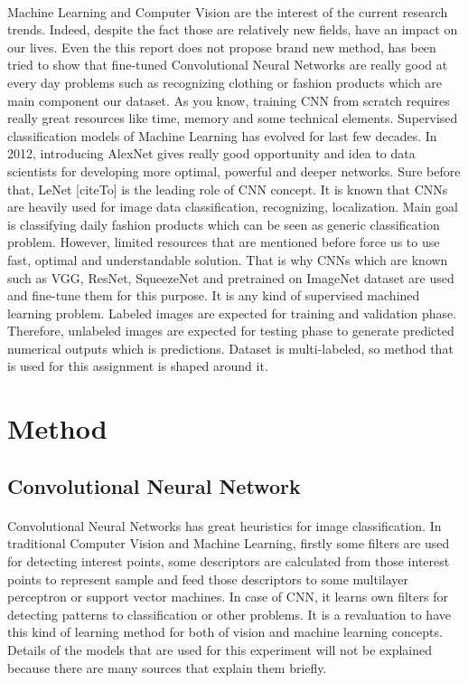 \paragraph{} Machine Learning and Computer Vision are the interest of the current research trends. Indeed, despite the fact those are relatively new fields, have an impact on our lives. Even the this report does not propose brand new method, has been tried to show that fine-tuned Convolutional Neural Networks are really good at every day problems such as recognizing clothing or fashion products which are main component our dataset. As you know, training CNN from scratch  requires really great resources like time, memory and some technical elements. Supervised  classification models of Machine Learning has evolved for last few decades. In 2012, introducing AlexNet \cite{alexnet}  gives really good opportunity and idea to data scientists for developing more optimal, powerful and deeper networks. Sure before that, LeNet [citeTo] is the leading role of CNN concept. It is known that CNNs are heavily used for image data classification, recognizing, localization. Main goal is classifying daily fashion products which can be seen as generic classification problem. However, limited resources that are mentioned before force us to use fast, optimal and understandable solution. That is why CNNs which are known such as VGG\cite{vggNet}, ResNet\cite{resnet}, SqueezeNet\cite{squeezenet} and pretrained on ImageNet dataset\cite{imageNet} are used and fine-tune them for this purpose. It is any kind of supervised machined learning problem. Labeled images are expected for training and validation phase. Therefore, unlabeled images are expected for testing phase to generate predicted numerical outputs which is predictions. Dataset is multi-labeled, so method that is used for this assignment is shaped around it.            

\section{Method}

\subsection{Convolutional Neural Network}

\paragraph{} Convolutional Neural Networks has great heuristics for image classification. In traditional Computer Vision and Machine Learning, firstly some filters are used for detecting interest points, some descriptors are calculated from those interest points to represent sample and feed those descriptors to some multilayer perceptron or support vector machines. In case of CNN, it learns own filters for detecting patterns to classification or other problems. It is a revaluation to have this kind of learning method for both of vision and machine learning concepts. Details of the models that are used for this experiment will not be explained because there are many sources that explain them briefly.

